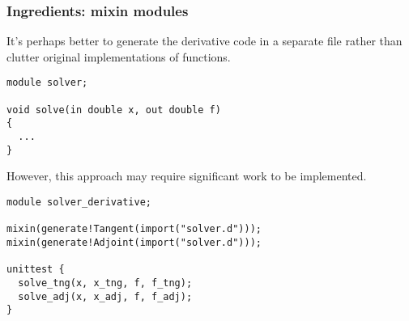 \documentclass[xcolor=dvipsnames]{beamer}
\begin{document}
\begin{frame}[fragile]
  \frametitle{Ingredients: mixin modules}
It's perhaps better to generate the derivative code in a separate file rather than clutter original implementations of functions.
  \begin{lstlisting}
module solver;

void solve(in double x, out double f)
{
  ...
}
  \end{lstlisting}
However, this approach may require significant work to be implemented.
  \begin{lstlisting}
module solver_derivative;

mixin(generate!Tangent(import("solver.d")));
mixin(generate!Adjoint(import("solver.d")));

unittest {
  solve_tng(x, x_tng, f, f_tng);
  solve_adj(x, x_adj, f, f_adj);
}
  \end{lstlisting}
\end{frame}
\end{document}

